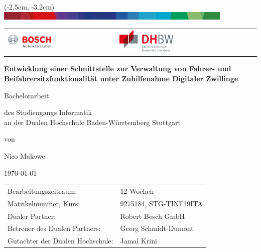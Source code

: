 \begin{titlepage}
	\begin{center}
		\begin{textblock*}{210mm}(-2.5cm, -3.2cm)
			\includegraphics[width=\paperwidth, height=4mm]{images/shared/Bosch-Supergraphic-Crop}
		\end{textblock*}
	\end{center}

	\vspace{-2.0cm}
	\begin{table}[h]
		\centering
		\begin{tabular}{p{}p{}p{}}
				\includegraphics[width=0.45\textwidth]{images/shared/Bosch-Logo-Ohne-Supergraphic} & &
				\raggedright
				\includegraphics[width=0.4\textwidth]{images/shared/DHBW-Logo}
		\end{tabular}
	\end{table}
		
	\begin{center}
		\LARGE
		\vspace*{1.5cm}
		
		\textbf{Entwicklung einer Schnittstelle zur Verwaltung von Fahrer- und Beifahrersitzfunktionalität unter Zuhilfenahme Digitaler Zwillinge}
		
		\vspace{1cm}
		\Large
		Bachelorarbeit
	
		\large
		\vspace{1cm}
		des Studiengangs Informatik \\ an der Dualen Hochschule Baden-Würrtemberg Stuttgart
		
		\vspace{1cm}
		von
		
		\Large
		\vspace{1cm}
		Nico Makowe
		
		\vspace{1cm}
		\today
		
		\vfill
		\large
		\begin{tabular}{l l}
			Bearbeitungszeitraum: & 12 Wochen \\
			Matrikelnummer, Kurs: & 9275184, STG-TINF19ITA \\
			Dualer Partner: & Robert Bosch GmbH \\
			Betreuer des Dualen Partners: & Georg Schmidt-Dumont\\
			Gutachter der Dualen Hochschule: & Jamal Krini
		\end{tabular}
	\end{center}
\end{titlepage}